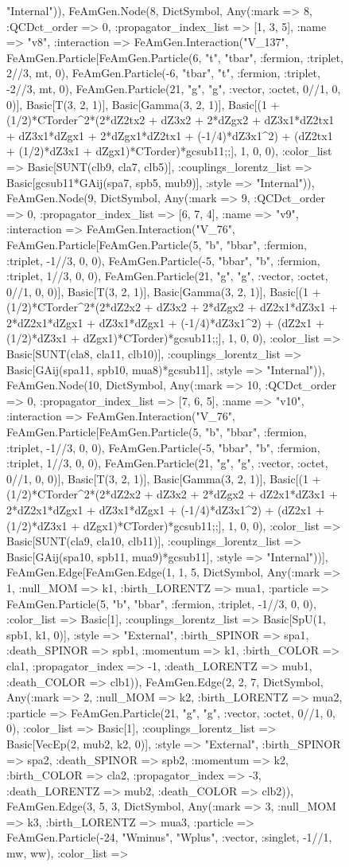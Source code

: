 \documentclass{revtex4}
\begin{document}
\begin{figure}[!htb]
\begin{center}
{"Internal")), FeAmGen.Node(8, Dict{Symbol, Any}(:mark => 8, :QCDct_order => 0, :propagator_index_list => [1, 3, 5], :name => "v8", :interaction => FeAmGen.Interaction("V_137", FeAmGen.Particle[FeAmGen.Particle(6, "t", "tbar", :fermion, :triplet, 2//3, mt, 0), FeAmGen.Particle(-6, "tbar", "t", :fermion, :triplet, -2//3, mt, 0), FeAmGen.Particle(21, "g", "g", :vector, :octet, 0//1, 0, 0)], Basic[T(3, 2, 1)], Basic[Gamma(3, 2, 1)], Basic[(1 + (1/2)*CTorder^2*(2*dZ2tx2 + dZ3x2 + 2*dZgx2 + dZ3x1*dZ2tx1 + dZ3x1*dZgx1 + 2*dZgx1*dZ2tx1 + (-1/4)*dZ3x1^2) + (dZ2tx1 + (1/2)*dZ3x1 + dZgx1)*CTorder)*gcsub11;;], 1, 0, 0), :color_list => Basic[SUNT(clb9, cla7, clb5)], :couplings_lorentz_list => Basic[gcsub11*GAij(spa7, spb5, mub9)], :style => "Internal")), FeAmGen.Node(9, Dict{Symbol, Any}(:mark => 9, :QCDct_order => 0, :propagator_index_list => [6, 7, 4], :name => "v9", :interaction => FeAmGen.Interaction("V_76", FeAmGen.Particle[FeAmGen.Particle(5, "b", "bbar", :fermion, :triplet, -1//3, 0, 0), FeAmGen.Particle(-5, "bbar", "b", :fermion, :triplet, 1//3, 0, 0), FeAmGen.Particle(21, "g", "g", :vector, :octet, 0//1, 0, 0)], Basic[T(3, 2, 1)], Basic[Gamma(3, 2, 1)], Basic[(1 + (1/2)*CTorder^2*(2*dZ2x2 + dZ3x2 + 2*dZgx2 + dZ2x1*dZ3x1 + 2*dZ2x1*dZgx1 + dZ3x1*dZgx1 + (-1/4)*dZ3x1^2) + (dZ2x1 + (1/2)*dZ3x1 + dZgx1)*CTorder)*gcsub11;;], 1, 0, 0), :color_list => Basic[SUNT(cla8, cla11, clb10)], :couplings_lorentz_list => Basic[GAij(spa11, spb10, mua8)*gcsub11], :style => "Internal")), FeAmGen.Node(10, Dict{Symbol, Any}(:mark => 10, :QCDct_order => 0, :propagator_index_list => [7, 6, 5], :name => "v10", :interaction => FeAmGen.Interaction("V_76", FeAmGen.Particle[FeAmGen.Particle(5, "b", "bbar", :fermion, :triplet, -1//3, 0, 0), FeAmGen.Particle(-5, "bbar", "b", :fermion, :triplet, 1//3, 0, 0), FeAmGen.Particle(21, "g", "g", :vector, :octet, 0//1, 0, 0)], Basic[T(3, 2, 1)], Basic[Gamma(3, 2, 1)], Basic[(1 + (1/2)*CTorder^2*(2*dZ2x2 + dZ3x2 + 2*dZgx2 + dZ2x1*dZ3x1 + 2*dZ2x1*dZgx1 + dZ3x1*dZgx1 + (-1/4)*dZ3x1^2) + (dZ2x1 + (1/2)*dZ3x1 + dZgx1)*CTorder)*gcsub11;;], 1, 0, 0), :color_list => Basic[SUNT(cla9, cla10, clb11)], :couplings_lorentz_list => Basic[GAij(spa10, spb11, mua9)*gcsub11], :style => "Internal"))], FeAmGen.Edge[FeAmGen.Edge(1, 1, 5, Dict{Symbol, Any}(:mark => 1, :null_MOM => k1, :birth_LORENTZ => mua1, :particle => FeAmGen.Particle(5, "b", "bbar", :fermion, :triplet, -1//3, 0, 0), :color_list => Basic[1], :couplings_lorentz_list => Basic[SpU(1, spb1, k1, 0)], :style => "External", :birth_SPINOR => spa1, :death_SPINOR => spb1, :momentum => k1, :birth_COLOR => cla1, :propagator_index => -1, :death_LORENTZ => mub1, :death_COLOR => clb1)), FeAmGen.Edge(2, 2, 7, Dict{Symbol, Any}(:mark => 2, :null_MOM => k2, :birth_LORENTZ => mua2, :particle => FeAmGen.Particle(21, "g", "g", :vector, :octet, 0//1, 0, 0), :color_list => Basic[1], :couplings_lorentz_list => Basic[VecEp(2, mub2, k2, 0)], :style => "External", :birth_SPINOR => spa2, :death_SPINOR => spb2, :momentum => k2, :birth_COLOR => cla2, :propagator_index => -3, :death_LORENTZ => mub2, :death_COLOR => clb2)), FeAmGen.Edge(3, 5, 3, Dict{Symbol, Any}(:mark => 3, :null_MOM => k3, :birth_LORENTZ => mua3, :particle => FeAmGen.Particle(-24, "Wminus", "Wplus", :vector, :singlet, -1//1, mw, ww), :color_list => }
\end{center}
\end{figure}
\end{document}
